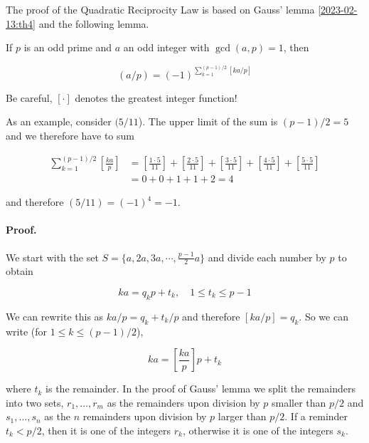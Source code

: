 
The proof of the Quadratic Reciprocity Law is based on Gauss' lemma \ref{2023-02-13:th4} and the following lemma.

\begin{theorem}
    If $p$ is an odd prime and $a$ an odd integer with $\gcd(a,p)=1$, then

    \begin{equation*}
        (a/p) = (-1)^{\sum_{k=1}^{(p-1)/2} [ka/p]}
    \end{equation*}

    Be careful, $[ \cdot ]$ denotes the greatest integer function!
\end{theorem}

As an example, consider $(5/11$). The upper limit of the sum is $(p-1)/2 = 5$ and we therefore have to sum

\begin{align*}
\sum_{k=1}^{(p-1)/2} \left[ \frac{ka}{p} \right] &= \left[ \frac{1 \cdot 5}{11} \right] + \left[ \frac{2 \cdot 5}{11} \right] + \left[ \frac{3 \cdot 5}{11} \right] + \left[ \frac{4 \cdot 5}{11} \right] + \left[ \frac{5 \cdot 5}{11} \right] \\
&= 0 + 0 + 1 + 1 + 2 = 4
\end{align*}

and therefore $(5/11) = (-1)^4 = -1$.

\paragraph{Proof.} We start with the set $S = \{a, 2a, 3a, \cdots, \frac{p-1}{2}a \}$ and divide each number by $p$ to obtain

\begin{equation*}
    ka = q_k p + t_k, \quad 1 \leq t_k \leq p-1
\end{equation*}

We can rewrite this as $ka/p = q_k + t_k / p$ and therefore $[ka/p] = q_k$. So we can write (for $1 \leq k \leq (p-1)/2$),

\begin{equation*}
    ka = \left[ \frac{ka}{p} \right] p + t_k
\end{equation*}

where $t_k$ is the remainder. In the proof of Gauss' lemma we split the remainders into two sets, $r_1, \ldots, r_m$ as the remainders upon division by $p$ smaller than $p/2$ and $s_1, \ldots, s_n$ as the $n$ remainders upon division by $p$ larger than $p/2$. If a reminder $t_k < p/2$, then it is one of the integers $r_k$, otherwise it is one of the integers $s_k$.

